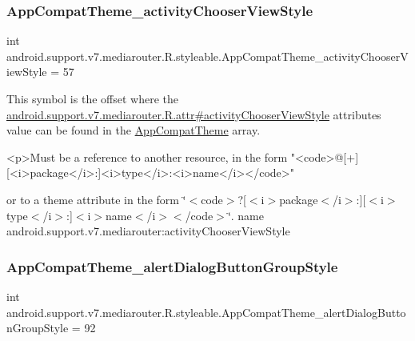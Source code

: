 \subsubsection{\texorpdfstring{App\+Compat\+Theme\+\_\+activity\+Chooser\+View\+Style}{AppCompatTheme\_activityChooserViewStyle}}
{\footnotesize\ttfamily int android.\+support.\+v7.\+mediarouter.\+R.\+styleable.\+App\+Compat\+Theme\+\_\+activity\+Chooser\+View\+Style = 57\hspace{0.3cm}{\ttfamily [static]}}

This symbol is the offset where the \hyperlink{classandroid_1_1support_1_1v7_1_1mediarouter_1_1R_1_1attr_ac8d39d5de178b7d6b845652c6e5f23c4}{android.\+support.\+v7.\+mediarouter.\+R.\+attr\#activity\+Chooser\+View\+Style} attribute\textquotesingle{}s value can be found in the \hyperlink{classandroid_1_1support_1_1v7_1_1mediarouter_1_1R_1_1styleable_a4e3d3900c75d49aeb2f283cac00214d6}{App\+Compat\+Theme} array.

\begin{DoxyVerb}      <p>Must be a reference to another resource, in the form "<code>@[+][<i>package</i>:]<i>type</i>:<i>name</i></code>"
\end{DoxyVerb}
 or to a theme attribute in the form \char`\"{}$<$code$>$?\mbox{[}$<$i$>$package$<$/i$>$\+:\mbox{]}\mbox{[}$<$i$>$type$<$/i$>$\+:\mbox{]}$<$i$>$name$<$/i$>$$<$/code$>$\char`\"{}.  name android.\+support.\+v7.\+mediarouter\+:activity\+Chooser\+View\+Style \mbox{\label{classandroid_1_1support_1_1v7_1_1mediarouter_1_1R_1_1styleable_a3a3facde74bdd9f3ab7535e69a8b2bab}} 
\subsubsection{\texorpdfstring{App\+Compat\+Theme\+\_\+alert\+Dialog\+Button\+Group\+Style}{AppCompatTheme\_alertDialogButtonGroupStyle}}
{\footnotesize\ttfamily int android.\+support.\+v7.\+mediarouter.\+R.\+styleable.\+App\+Compat\+Theme\+\_\+alert\+Dialog\+Button\+Group\+Style = 92\hspace{0.3cm}{\ttfamily [static]}}

